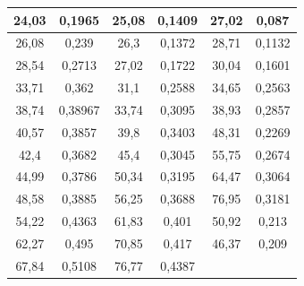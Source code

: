 \documentclass[a4paper, 12pt]{article}
\begin{document}
\begin{table}[h!]
\begin{center}
\begin{tabular}{|cccccc|}
\multicolumn{1}{|c|}{{ 24,03}} & \multicolumn{1}{c|}{{ 0,1965}}  & \multicolumn{1}{c|}{{ 25,08}} & \multicolumn{1}{c|}{{ 0,1409}} & \multicolumn{1}{c|}{{ 27,02}} & { 0,087}  \\ \hline
\multicolumn{1}{|c|}{{ 26,08}} & \multicolumn{1}{c|}{{ 0,239}}   & \multicolumn{1}{c|}{{ 26,3}}  & \multicolumn{1}{c|}{{ 0,1372}} & \multicolumn{1}{c|}{{ 28,71}} & { 0,1132} \\ \hline
\multicolumn{1}{|c|}{{ 28,54}} & \multicolumn{1}{c|}{{ 0,2713}}  & \multicolumn{1}{c|}{{ 27,02}} & \multicolumn{1}{c|}{{ 0,1722}} & \multicolumn{1}{c|}{{ 30,04}} & { 0,1601} \\ \hline
\multicolumn{1}{|c|}{{ 33,71}} & \multicolumn{1}{c|}{{ 0,362}}   & \multicolumn{1}{c|}{{ 31,1}}  & \multicolumn{1}{c|}{{ 0,2588}} & \multicolumn{1}{c|}{{ 34,65}} & { 0,2563} \\ \hline
\multicolumn{1}{|c|}{{ 38,74}} & \multicolumn{1}{c|}{{ 0,38967}} & \multicolumn{1}{c|}{{ 33,74}} & \multicolumn{1}{c|}{{ 0,3095}} & \multicolumn{1}{c|}{{ 38,93}} & { 0,2857} \\ \hline
\multicolumn{1}{|c|}{{ 40,57}} & \multicolumn{1}{c|}{{ 0,3857}}  & \multicolumn{1}{c|}{{ 39,8}}  & \multicolumn{1}{c|}{{ 0,3403}} & \multicolumn{1}{c|}{{ 48,31}} & { 0,2269} \\ \hline
\multicolumn{1}{|c|}{{ 42,4}}  & \multicolumn{1}{c|}{{ 0,3682}}  & \multicolumn{1}{c|}{{ 45,4}}  & \multicolumn{1}{c|}{{ 0,3045}} & \multicolumn{1}{c|}{{ 55,75}} & { 0,2674} \\ \hline
\multicolumn{1}{|c|}{{ 44,99}} & \multicolumn{1}{c|}{{ 0,3786}}  & \multicolumn{1}{c|}{{ 50,34}} & \multicolumn{1}{c|}{{ 0,3195}} & \multicolumn{1}{c|}{{ 64,47}} & { 0,3064} \\ \hline
\multicolumn{1}{|c|}{{ 48,58}} & \multicolumn{1}{c|}{{ 0,3885}}  & \multicolumn{1}{c|}{{ 56,25}} & \multicolumn{1}{c|}{{ 0,3688}} & \multicolumn{1}{c|}{{ 76,95}} & { 0,3181} \\ \hline
\multicolumn{1}{|c|}{{ 54,22}} & \multicolumn{1}{c|}{{ 0,4363}}  & \multicolumn{1}{c|}{{ 61,83}} & \multicolumn{1}{c|}{{ 0,401}}  & \multicolumn{1}{c|}{{ 50,92}} & { 0,213}  \\ \hline
\multicolumn{1}{|c|}{{ 62,27}} & \multicolumn{1}{c|}{{ 0,495}}   & \multicolumn{1}{c|}{{ 70,85}} & \multicolumn{1}{c|}{{ 0,417}}  & \multicolumn{1}{c|}{{ 46,37}} & { 0,209}  \\ \hline
\multicolumn{1}{|c|}{{ 67,84}} & \multicolumn{1}{c|}{{ 0,5108}}  & \multicolumn{1}{c|}{{ 76,77}} & \multicolumn{1}{c|}{{ 0,4387}} & \multicolumn{1}{c|}{{ }}      & { }       \\ \hline

\end{tabular}
\end{center}
\end{table}
\end{document}
